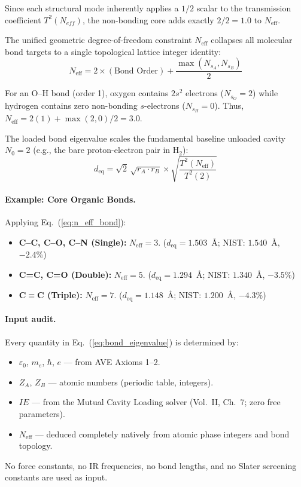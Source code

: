 Since each structural mode inherently applies a $1/2$ scalar to the transmission coefficient $T^2(N_{eff})$, the non-bonding core adds exactly $2/2 = 1.0$ to $N_\text{eff}$.

The unified geometric degree-of-freedom constraint $N_\text{eff}$ collapses all molecular bond targets to a single topological lattice integer identity:
\begin{equation}
    N_\text{eff} = 2 \times (\text{Bond Order}) + \frac{\max(N_{s_A}, N_{s_B})}{2}
    \label{eq:n_eff_bond}
\end{equation}

For an O--H bond (order 1), oxygen contains $2s^2$ electrons ($N_{s_O}=2$) while hydrogen contains zero non-bonding $s$-electrons ($N_{s_H}=0$). Thus, $N_\text{eff} = 2(1) + \max(2, 0)/2 = 3.0$.

The loaded bond eigenvalue scales the fundamental baseline unloaded cavity $N_0 = 2$ (e.g., the bare proton-electron pair in H$_2$):
\begin{equation}
    \boxed{d_\text{eq} = \sqrt{2}\,\sqrt{r_A \cdot r_B} \times \sqrt{\frac{T^2(N_\text{eff})}{T^2(2)}}}
    \label{eq:bond_eigenvalue}
\end{equation}

\paragraph{Example: Core Organic Bonds.}
Applying Eq.~(\ref{eq:n_eff_bond}):
\begin{itemize}
    \item \textbf{C--C, C--O, C--N (Single):} $N_\text{eff} = 3$. ($d_\text{eq} = 1.503$~\AA; NIST: $1.540$~\AA, $-2.4\%$)
    \item \textbf{C=C, C=O (Double):} $N_\text{eff} = 5$. ($d_\text{eq} = 1.294$~\AA; NIST: $1.340$~\AA, $-3.5\%$)
    \item \textbf{C$\equiv$C (Triple):} $N_\text{eff} = 7$. ($d_\text{eq} = 1.148$~\AA; NIST: $1.200$~\AA, $-4.3\%$)
\end{itemize}

\paragraph{Input audit.} Every quantity in Eq.~(\ref{eq:bond_eigenvalue}) is determined by:
\begin{itemize}
    \item $\varepsilon_0$, $m_e$, $\hbar$, $e$ --- from AVE Axioms 1--2.
    \item $Z_A$, $Z_B$ --- atomic numbers (periodic table, integers).
    \item $IE$ --- from the Mutual Cavity Loading solver (Vol.~II, Ch.~7; zero free parameters).
    \item $N_\text{eff}$ --- deduced completely natively from atomic phase integers and bond topology.
\end{itemize}
No force constants, no IR frequencies, no bond lengths, and no Slater screening constants are used as input.

